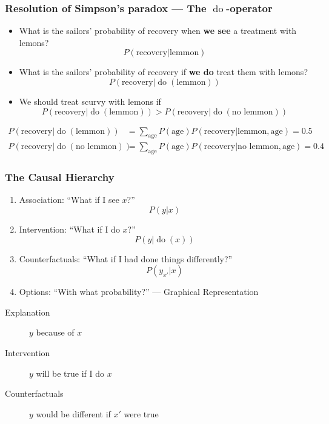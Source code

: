 \documentclass[UTF8,11pt,colorlinks,compress,openany]{beamer}%
\begin{document}
\begin{frame}\frametitle{Resolution of Simpson's paradox --- The $\operatorname{do}$-operator}
\begin{itemize}
	\item What is the sailors' probability of recovery when \textbf{we see} a treatment with lemons?
	\[P(\text{recovery}|\text{lemmon})\]
	\item What is the sailors' probability of recovery if \textbf{we do} treat them with lemons?
	\[P(\text{recovery}|\operatorname{do}(\text{lemmon}))\]
	\item We should treat scurvy with lemons if
	\[P(\text{recovery}|\operatorname{do}(\text{lemmon}))>P(\text{recovery}|\operatorname{do}(\text{no lemmon}))\]
\end{itemize}
\begin{align*}
P(\text{recovery}|\operatorname{do}(\text{lemmon}))&=\sum\limits_{\text{age}} P(\text{age})P(\text{recovery}|\text{lemmon},\text{age})=0.5\\
P(\text{recovery}|\operatorname{do}(\text{no lemmon}))&=\sum\limits_{\text{age}} P(\text{age})P(\text{recovery}|\text{no lemmon},\text{age})=0.4
\end{align*}
\end{frame}

\begin{frame}\frametitle{The Causal Hierarchy}
\begin{enumerate}
	\item Association: ``What if I see $x$?'' \[P(y|x)\]
	\item Intervention: ``What if I do $x$?'' \[P(y|\operatorname{do}(x))\]
	\item Counterfactuals: ``What if I had done things differently?'' \[P(y_{x'}|x)\]
	\item Options: ``With what probability?'' --- Graphical Representation
\end{enumerate}
\begin{description}
	\item[Explanation] $y$ because of $x$
	\item[Intervention] $y$ will be true if I do $x$
	\item[Counterfactuals] $y$ would be different if $x'$ were true
\end{description}
\end{frame}
\end{document}

